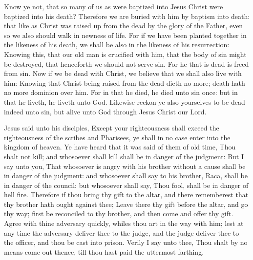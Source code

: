  Know ye not, that so many of us as were baptized into Jesus Christ were baptized into his death? Therefore we are buried with him by baptism into death: that like as Christ was raised up from the dead by the glory of the Father, even so we also should walk in newness of life. For if we have been planted together in the likeness of his death, we shall be also in the likeness of his resurrection: Knowing this, that our old man is crucified with him, that the body of sin might be destroyed, that henceforth we should not serve sin. For he that is dead is freed from sin. Now if we be dead with Christ, we believe that we shall also live with him: Knowing that Christ being raised from the dead dieth no more; death hath no more dominion over him. For in that he died, he died unto sin once: but in that he liveth, he liveth unto God. Likewise reckon ye also yourselves to be dead indeed unto sin, but alive unto God through Jesus Christ our Lord.


 Jesus said unto his disciples, Except your righteousness shall exceed the righteousness of the scribes and Pharisees, ye shall in no case enter into the kingdom of heaven. Ye have heard that it was said of them of old time, Thou shalt not kill; and whosoever shall kill shall be in danger of the judgment: But I say unto you, That whosoever is angry with his brother without a cause shall be in danger of the judgment: and whosoever shall say to his brother, Raca, shall be in danger of the council: but whosoever shall say, Thou fool, shall be in danger of hell fire. Therefore if thou bring thy gift to the altar, and there rememberest that thy brother hath ought against thee; Leave there thy gift before the altar, and go thy way; first be reconciled to thy brother, and then come and offer thy gift. Agree with thine adversary quickly, whiles thou art in the way with him; lest at any time the adversary deliver thee to the judge, and the judge deliver thee to the officer, and thou be cast into prison. Verily I say unto thee, Thou shalt by no means come out thence, till thou hast paid the uttermost farthing.

